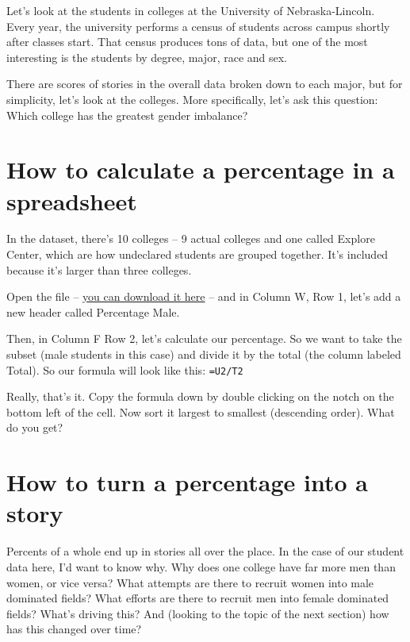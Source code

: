 \documentclass[]{book}
\begin{document}
Let's look at the students in colleges at the University of Nebraska-Lincoln. Every year, the university performs a census of students across campus shortly after classes start. That census produces tons of data, but one of the most interesting is the students by degree, major, race and sex.

There are scores of stories in the overall data broken down to each major, but for simplicity, let's look at the colleges. More specifically, let's ask this question: Which college has the greatest gender imbalance?

\hypertarget{how-to-calculate-a-percentage-in-a-spreadsheet}{%
\section{How to calculate a percentage in a spreadsheet}\label{how-to-calculate-a-percentage-in-a-spreadsheet}}

In the dataset, there's 10 colleges -- 9 actual colleges and one called Explore Center, which are how undeclared students are grouped together. It's included because it's larger than three colleges.

Open the file -- \href{https://www.dropbox.com/s/ilk87n6ug1l7v53/students.csv?dl=0}{you can download it here} -- and in Column W, Row 1, let's add a new header called Percentage Male.

Then, in Column F Row 2, let's calculate our percentage. So we want to take the subset (male students in this case) and divide it by the total (the column labeled Total). So our formula will look like this: \texttt{=U2/T2}

Really, that's it. Copy the formula down by double clicking on the notch on the bottom left of the cell. Now sort it largest to smallest (descending order). What do you get?

\hypertarget{how-to-turn-a-percentage-into-a-story}{%
\section{How to turn a percentage into a story}\label{how-to-turn-a-percentage-into-a-story}}

Percents of a whole end up in stories all over the place. In the case of our student data here, I'd want to know why. Why does one college have far more men than women, or vice versa? What attempts are there to recruit women into male dominated fields? What efforts are there to recruit men into female dominated fields? What's driving this? And (looking to the topic of the next section) how has this changed over time?
\end{document}
